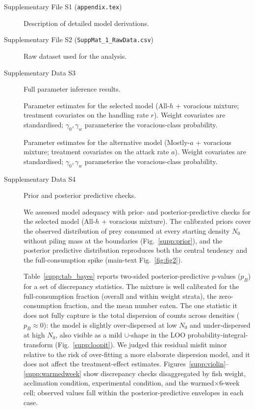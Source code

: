 \documentclass[ASNA,twocolumn]{USG} %
\begin{document}
\begin{description}

\item[\hypertarget{supp:S1}{Supplementary File S1 (\texttt{appendix.tex})}]
Description of detailed model derivations.

\item[\hypertarget{supp:S2}{Supplementary File S2 (\texttt{SuppMat\_1\_RawData.csv})}]
Raw dataset used for the analysis.


\item[\hypertarget{supp:S3}{Supplementary Data S3}] Full parameter inference results.


\begin{table}[h]\centering

\caption{Parameter estimates for the selected model (All-$h$ + voracious mixture; treatment covariates on the handling rate $r$). Weight covariates are standardised; $\gamma_0,\gamma_w$ parameterise the voracious-class probability.}
\end{table}

\begin{table}[h]\centering

\caption{Parameter estimates for the alternative model (Mostly-$a$ + voracious mixture; treatment covariates on the attack rate $a$). Weight covariates are standardised; $\gamma_0,\gamma_w$ parameterise the voracious-class probability.}
\end{table}







\item[\hypertarget{supp:S4}{Supplementary Data S4}] Prior and posterior predictive checks.

We assessed model adequacy with prior- and posterior-predictive checks for the selected model (All-$h$ + voracious mixture). The calibrated priors cover the observed distribution of prey consumed at every starting density $N_0$ without piling mass at the boundaries (Fig.~\ref{supp:prior}), and the posterior predictive distribution reproduces both the central tendency and the full-consumption spike (main-text Fig.~\ref{fig:fig2}).

Table~\ref{supp:tab_bayes} reports two-sided posterior-predictive $p$-values ($p_B$) for a set of discrepancy statistics. The mixture is well calibrated for the full-consumption fraction (overall and within weight strata), the zero-consumption fraction, and the mean number eaten. The one statistic it does not fully capture is the total dispersion of counts across densities ($p_B \approx 0$): the model is slightly over-dispersed at low $N_0$ and under-dispersed at high $N_0$, also visible as a mild $\cup$-shape in the LOO probability-integral-transform (Fig.~\ref{supp:loopit}). We judged this residual misfit minor relative to the risk of over-fitting a more elaborate dispersion model, and it does not affect the treatment-effect estimates. Figures~\ref{supp:violin}--\ref{supp:warmedweek} show discrepancy checks disaggregated by fish weight, acclimation condition, experimental condition, and the warmed$\times$6-week cell; observed values fall within the posterior-predictive envelopes in each case.


\end{description}
\end{document}
